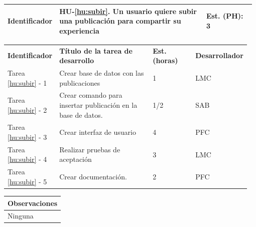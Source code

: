 \documentclass[11pt]{article}
\begin{document}
\begin{longtable}{p{0.18\linewidth}|p{0.6\linewidth}|p{0.2\linewidth}}
  \rowcolor{LightCyan}
  \textbf{Identificador} & \textbf{HU-\ref{hu:subir}}. Un usuario quiere subir una publicación para compartir su experiencia& \textbf{Est. (PH):} 3 \\
  \bottomrule
\end{longtable}
\vspace{-0.5cm}
\begin{longtable}{p{0.18\linewidth}|p{0.4\linewidth}|p{0.18\linewidth}|p{0.2\linewidth}}
  \toprule
  \textbf{Identificador} & \textbf{Título de la tarea de desarrollo} & \textbf{Est. (horas)} & \textbf{Desarrollador} \\
  Tarea \ref{hu:subir} - 1 & Crear base de datos con las publicaciones & 1 & LMC\\
  Tarea \ref{hu:subir} - 2 & Crear comando para insertar publicación en la base de datos. & 1/2 & SAB \\
  Tarea \ref{hu:subir} - 3 & Crear interfaz de usuario & 4 & PFC\\
  Tarea \ref{hu:subir} - 4 & Realizar pruebas de aceptación & 3 & LMC\\
  Tarea \ref{hu:subir} - 5 & Crear documentación. & 2 & PFC\\
  \bottomrule
\end{longtable}
\vspace{-0.5cm}
\begin{longtable}{p{1.028\linewidth}}
  \textbf{Observaciones}\\
  \midrule
  Ninguna\\
  \bottomrule
\end{longtable}
\end{document}
